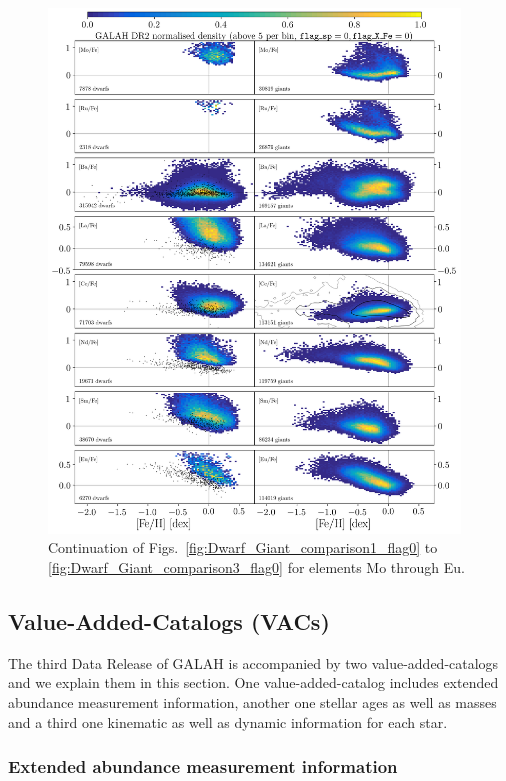 \documentclass[fleqn,usenatbib,useAMS]{mnras}
\begin{document}
\begin{figure}
  \includegraphics[width=0.975\textwidth]{Figures/Dwarf_Giant_comparison4_flag0.png}
\caption{Continuation of Figs.~\ref{fig:Dwarf_Giant_comparison1_flag0} to \ref{fig:Dwarf_Giant_comparison3_flag0} for elements Mo through Eu.}   \label{fig:Dwarf_Giant_comparison4_flag0}
\end{figure}

\subsection{Value-Added-Catalogs (VACs)} \label{sec:value_added_catalogs}

The third Data Release of GALAH is accompanied by two value-added-catalogs and we explain them in this section. One value-added-catalog includes extended abundance measurement information, another one stellar ages as well as masses and a third one kinematic as well as dynamic information for each star.

\subsubsection{Extended abundance measurement information}
\end{document}

